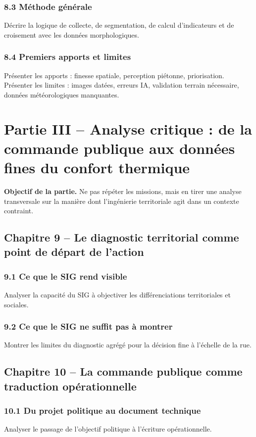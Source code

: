 \documentclass[11pt,a4paper]{article}
\begin{document}
\subsubsection{8.3 Méthode générale}
Décrire la logique de collecte, de segmentation, de calcul d'indicateurs et de croisement avec les données morphologiques.

\subsubsection{8.4 Premiers apports et limites}
Présenter les apports : finesse spatiale, perception piétonne, priorisation. Présenter les limites : images datées, erreurs IA, validation terrain nécessaire, données météorologiques manquantes.

\section{Partie III -- Analyse critique : de la commande publique aux données fines du confort thermique}

\textbf{Objectif de la partie.} Ne pas répéter les missions, mais en tirer une analyse transversale sur la manière dont l'ingénierie territoriale agit dans un contexte contraint.

\subsection{Chapitre 9 -- Le diagnostic territorial comme point de départ de l'action}

\subsubsection{9.1 Ce que le SIG rend visible}
Analyser la capacité du SIG à objectiver les différenciations territoriales et sociales.

\subsubsection{9.2 Ce que le SIG ne suffit pas à montrer}
Montrer les limites du diagnostic agrégé pour la décision fine à l'échelle de la rue.

\subsection{Chapitre 10 -- La commande publique comme traduction opérationnelle}

\subsubsection{10.1 Du projet politique au document technique}
Analyser le passage de l'objectif politique à l'écriture opérationnelle.
\end{document}
